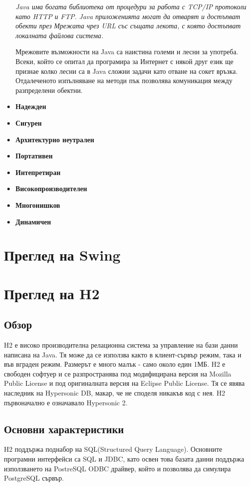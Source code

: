 \begin{itemize}
    \emph{Java има богата библиотека от процедури за работа с TCP/IP
    протоколи като HTTP и FTP. Java приложенията могат да отварят и
    достъпват обекти през Мрежата чрез URL със същата лекота, с която
    достъпват локалната файлова система.}

    Мрежовите възможности на Java са наистина големи и лесни за
    употреба. Всеки, който се опитал да програмира за Интернет с някой
    друг език ще признае колко лесни са в Java сложни задачи като
    отване на сокет връзка. Отдалеченото изпълняване на методи пък
    позволява комуникация между разпределени обектни.

  \item \textbf{Надежден}
  \item \textbf{Сигурен}
  \item \textbf{Архитектурно неутрален}
  \item \textbf{Портативен}
  \item \textbf{Интепретиран}
  \item \textbf{Високопроизводителен}
  \item \textbf{Многонишков}
  \item \textbf{Динамичен}
\end{itemize}
\section{Преглед на Swing}
\section{Преглед на H2}
\subsection{Обзор}
H2 е високо производителна релационна система за управление на бази
данни написана на Java. Тя може да се използва както в клиент-сървър
режим, така и във вграден режим. Размерът е много малък - само около
един 1МБ. H2 е свободен софтуер и се разпространява под модифицирана
версия на Mozilla Public License и под оригиналната версия на Eclipse
Public License. Тя се явява наследник на Hypersonic DB, макар, че не
споделя никакъв код с нея. H2 първоначално е означавало Hypersonic 2.

\subsection{Основни характеристики}
H2 поддържа поднабор на SQL(Structured Query Language). Основните
програмни интерфейси са SQL и JDBC, като освен това базата данни
поддържа използването на PostreSQL ODBC драйвер, който и позволява да
симулира PostgreSQL сървър.

